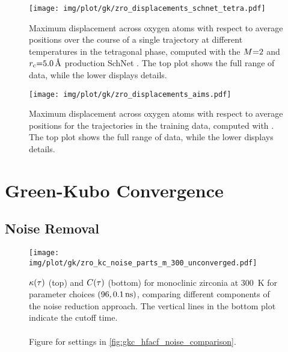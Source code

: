 \begin{figure}
  \texttt{[image: img/plot/gk/zro\_displacements\_schnet\_tetra.pdf]}
  \caption{
  Maximum displacement across oxygen atoms with respect to average positions over the course of a single trajectory at different temperatures in the tetragonal phase, computed with the $M{=}2$ and $r_{\text{c}}{=}\qty{5.0}{\angstrom}$ production SchNet \mlp.
  The top plot shows the full range of data, while the lower displays details.
  }
  \label{fig:si-gkm_disp_schnet_tetra}
\end{figure}


\begin{figure}
  \texttt{[image: img/plot/gk/zro\_displacements\_aims.pdf]}
  \caption{
  Maximum displacement across oxygen atoms with respect to average positions for the trajectories in the training data, computed with \aims.
  The top plot shows the full range of data, while the lower displays details.
  }
  \label{fig:si-gkm_disp_aims}
\end{figure}


\clearpage
\section{Green-Kubo Convergence}



\subsection{Noise Removal}

\begin{figure*}
  \texttt{[image: img/plot/gk/zro\_kc\_noise\_parts\_m\_300\_unconverged.pdf]}
  \caption{
  $\kappa(\tau)$ (top) and $C(\tau)$ (bottom) for monoclinic zirconia at \qty{300}{K} for  parameter choices $(96, \qty{0.1}{ns})$, comparing different components of the noise reduction approach.
  The vertical lines in the bottom plot indicate the cutoff time.
  \\\\
  Figure for  settings in \cref{fig:gkc_hfacf_noise_comparison}.
  }
  \label{fig:si-gkc_hfacf_noise_comparison_unconverged}
\end{figure*}

